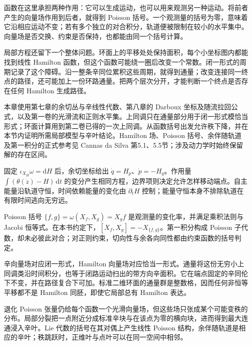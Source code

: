 \ProseParagraphBreak

函数在这里承担两种作用：它可以生成运动，也可以用来观测另一种运动。将前者产生的向量场作用到后者，就得到 Poisson 括号。一个观测量的括号为零，意味着它沿相应运动不变；若有多个独立的对合积分，轨道便被限制在较小的水平集中。向量场是否交换、约束是否保持，也都能由同一个括号计算。

\ProseParagraphBreak

局部方程还留下一个整体问题。环面上的平移处处保持面积，每个小坐标图内都能找到线性 Hamilton 函数，但这个函数可能绕一圈后改变一个常数。闭一形式的周期记录了这个障碍。沿一整条辛同位累积这些周期，就得到通量；改变连接同一终点的路径，还可能加上一份环路通量。把两个层次分开，才能判断一个终点是否存在任何 Hamilton 生成路径。

\ProseParagraphBreak

本章使用第七章的余切丛与辛线性代数、第八章的 Darboux 坐标及随流拉回公式，以及第一卷的光滑流和正则水平集。上同调只在通量部分用于闭一形式模恰当形式；环面计算用到第二卷已得的一次上同调。从函数括号出发允许秩下降，并在本节内证明所需局部模型与辛叶结论。Hamilton 场、Poisson 括号、余伴随轨道及第一积分的正式参考见 Cannas da Silva 第5.1、5.5节；涉及动力学时始终保留解的存在区间。\cite[第5.1、5.5节]{Cannas2006Symplectic}






\begin{chaptersummary}
固定 \(\iota_{X_H}\omega=\mathrm{d}H\) 后，余切坐标给出 \(\dot q=H_p\)、\(\dot p=-H_q\)。作用量 \(\int(\theta(\dot z)-H)\,\mathrm{d}t\) 的变分产生相同方程，边界项则决定允许怎样移动端点。自主能量沿轨道守恒，时间依赖能量的变化由 \(\partial_tH\) 控制；能量守恒本身不排除轨道在有限时间逃向无穷远。

\ProseParagraphBreak

Poisson 括号 \(\{f,g\}=\omega(X_f,X_g)=X_gf\) 是观测量的变化率，并满足乘积法则与 Jacobi 恒等式。在本书约定下，\([X_f,X_g]=-X_{\{f,g\}}\)。第一积分构成 Poisson 子代数，却未必彼此对合；对正则约束，切向性与余各向同性都由约束函数的括号判定。

\ProseParagraphBreak

辛向量场对应闭一形式，Hamilton 向量场对应恰当一形式。通量将这份无穷小上同调类沿时间积分，也等于闭路运动扫出的带方向辛面积。它在端点固定的辛同伦下不变，并在路径复合下可加。标准二维环面的通量群是整数格，因而任何非恒等平移都不是 Hamilton 同胚，即使它局部总有 Hamilton 表达。

\ProseParagraphBreak

退化 Poisson 张量仍给每个函数一个光滑向量场，但这些场只张成某个可能变秩的分布。局部分裂把一点附近分成标准辛块与在该点为零的横向块，进而得到最大连通浸入辛叶。Lie 代数的括号在其对偶上产生线性 Poisson 结构，余伴随轨道是相应的辛叶；秩跳跃时，正维叶与点叶可以在同一空间中相邻。
\end{chaptersummary}

